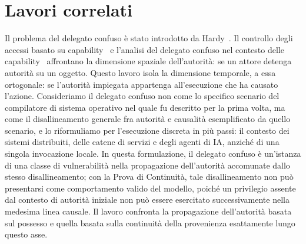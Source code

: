 \documentclass[11pt]{article}
\begin{document}
\section*{Lavori correlati}

Il problema del delegato confuso è stato introdotto da
Hardy~\cite{hardy1988confused}. Il controllo degli accessi basato su
capability~\cite{dennis1966programming} e l'analisi del delegato confuso nel
contesto delle capability~\cite{miller2003capability} affrontano la dimensione
spaziale dell'autorità: se un attore detenga autorità su un oggetto. Questo
lavoro isola la dimensione temporale, a essa ortogonale: se l'autorità impiegata
appartenga all'esecuzione che ha causato l'azione. Consideriamo il delegato
confuso non come lo specifico scenario del compilatore di sistema operativo nel
quale fu descritto per la prima volta, ma come il disallineamento generale fra
autorità e causalità esemplificato da quello scenario, e lo riformuliamo per
l'esecuzione discreta in più passi: il contesto dei sistemi distribuiti, delle
catene di servizi e degli agenti di IA, anziché di una singola invocazione
locale. In questa formulazione, il delegato confuso è un'istanza di una classe di
vulnerabilità nella propagazione dell'autorità accomunate dallo stesso
disallineamento; con la Prova di Continuità, tale disallineamento non può
presentarsi come comportamento valido del modello, poiché un privilegio assente
dal contesto di autorità iniziale non può essere esercitato successivamente
nella medesima linea causale. Il lavoro confronta la propagazione dell'autorità
basata sul possesso e quella basata sulla continuità della provenienza
esattamente lungo questo asse.
\end{document}
